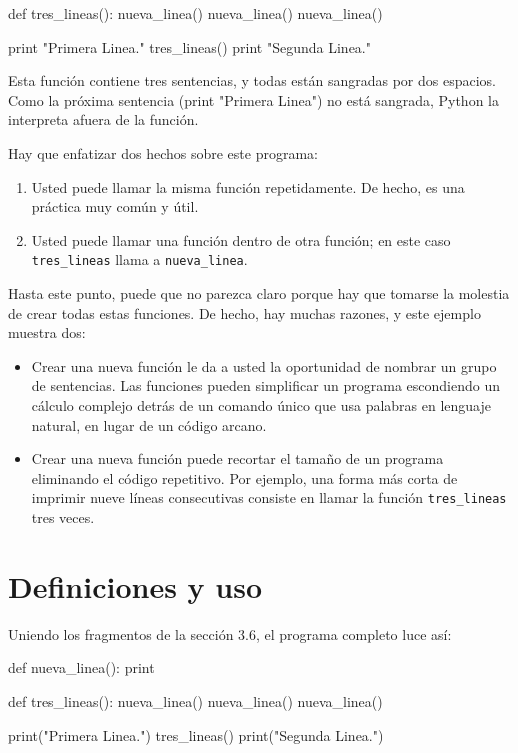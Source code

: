 \beforeverb
\begin{pythoncode}
def tres_lineas():
  nueva_linea()
  nueva_linea()
  nueva_linea()

print "Primera Linea."
tres_lineas()
print "Segunda Linea."
\end{pythoncode}
\afterverb
%

Esta función contiene tres sentencias, y todas están sangradas por dos espacios.
Como la próxima sentencia (print "Primera Linea") no está sangrada, Python la
interpreta afuera de la función.

Hay que enfatizar dos hechos sobre este programa:

\begin{enumerate}
	\item Usted puede llamar la misma función repetidamente.  De hecho, es una 
	práctica muy común y útil.
	
	\item Usted puede llamar una función dentro de otra función; en este caso
	\texttt{tres\_lineas} llama a \texttt{nueva\_linea}.
\end{enumerate}

Hasta este punto, puede que no parezca claro porque hay que tomarse la molestia
de crear todas estas funciones. De hecho, hay muchas razones, y este ejemplo 
muestra dos:

\begin{itemize}
	\item Crear una nueva función le da a usted la oportunidad de nombrar un
	grupo de sentencias. Las funciones pueden simplificar un programa 
	escondiendo un cálculo complejo detrás de un comando único que usa palabras 
	en lenguaje	natural, en lugar de un código arcano.
	
	\item Crear una nueva función puede recortar el tamaño de un programa 
	eliminando el código repetitivo. Por ejemplo, una forma más corta de 
	imprimir nueve líneas consecutivas consiste en llamar la función 
	\texttt{tres\_lineas} tres veces.
\end{itemize}

\section{Definiciones y uso}

Uniendo los fragmentos de la sección 3.6, el programa completo luce así:

\beforeverb
\begin{pythoncode}
def nueva_linea():
  print

def tres_lineas():
  nueva_linea()
  nueva_linea()
  nueva_linea()

print("Primera Linea.")
tres_lineas()
print("Segunda Linea.")
\end{pythoncode}
\afterverb
%

